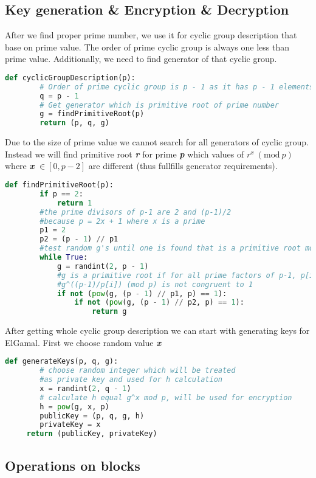 \documentclass[a4paper,12pt]{article}
\newcommand{\Mod}[1]{\ (\mathrm{mod}\ #1)}
\begin{document}
\subsection{Key generation \& Encryption \& Decryption}
After we find proper prime number, we use it for cyclic group description that base on prime value. 
The order of prime cyclic group is always one less than prime value. Additionally, we need to find generator of that cyclic group. 
\begin{lstlisting}[language=Python]
    def cyclicGroupDescription(p):
        # Order of prime cyclic group is p - 1 as it has p - 1 elements in group
        q = p - 1
        # Get generator which is primitive root of prime number
        g = findPrimitiveRoot(p)
        return (p, q, g)
\end{lstlisting}
Due to the size of prime value we cannot search for all generators of cyclic group. 
Instead we will find primitive root \textbf{\textit{r}} for prime \textbf{\textit{p}} which values of $r^x \Mod p$ where \textbf{\textit{x}}  $\in [0, p-2]$ are different (thus fullfills generator requirements). 
\begin{lstlisting}[language=Python]
    def findPrimitiveRoot(p):
        if p == 2:
            return 1
        #the prime divisors of p-1 are 2 and (p-1)/2 
        #because p = 2x + 1 where x is a prime
        p1 = 2
        p2 = (p - 1) // p1
        #test random g's until one is found that is a primitive root mod p
        while True:
            g = randint(2, p - 1)
            #g is a primitive root if for all prime factors of p-1, p[i]
            #g^((p-1)/p[i]) (mod p) is not congruent to 1
            if not (pow(g, (p - 1) // p1, p) == 1):
                if not (pow(g, (p - 1) // p2, p) == 1):
                    return g
\end{lstlisting}
After getting whole cyclic group description we can start with generating keys for ElGamal. 
First we choose random value \textbf{\textit{x}} 
\begin{lstlisting}[language=Python]
    def generateKeys(p, q, g):
        # choose random integer which will be treated 
        #as private key and used for h calculation 
        x = randint(2, q - 1) 
        # calculate h equal g^x mod p, will be used for encryption
        h = pow(g, x, p) 
        publicKey = (p, q, g, h)
        privateKey = x
     return (publicKey, privateKey)
\end{lstlisting}

\subsection{Operations on blocks}
\end{document}
